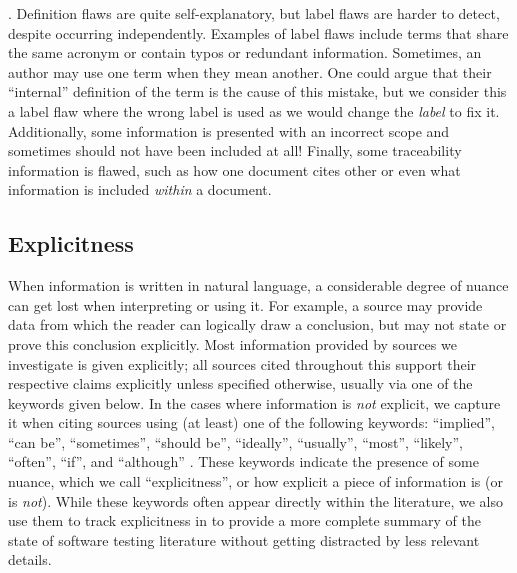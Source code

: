 \label{label-flaw-def}
. Definition flaws are quite self-explanatory, but
label flaws are harder to detect, despite occurring independently. Examples of
label flaws include terms that share the same acronym or contain typos or
redundant information. Sometimes, an author may use one term when they mean
another. One could argue that their ``internal'' definition of the term is the
cause of this mistake, but we consider this a label flaw where the wrong
label is used as we would change the \emph{label} to fix it.
\label{scope-flaw-def}%
Additionally, some information is presented with an incorrect scope and
sometimes should not have been included at all!
\label{trace-flaw-def}%
Finally, some traceability information is flawed, such as how one document
cites other or even what information is included \emph{within} a document.

\subsection{Explicitness}\label{explicitness}

\def\impKeywordsCode{\seeSrcCode{9b04254}{scripts/helpers.py}{25}{54}}

When information is written in natural language, a considerable degree of
nuance can get lost when interpreting or using it. For
example, a source may provide data from which the reader can logically draw a
conclusion, but may not state or prove this conclusion explicitly.
Most information provided by sources we investigate is given explicitly; all
sources cited throughout this \docType{} support their
respective claims explicitly unless specified otherwise, usually via one of the
keywords given below. In the cases where information is \emph{not} explicit, we
capture it when citing sources using (at least) one of the following keywords:
``implied'', ``can be'', ``sometimes'', ``should be'', ``ideally'', ``usually'',
``most'', ``likely'', ``often'', ``if'', and ``although''%
\utd{}. These keywords indicate the presence of some nuance, which we call
``explicitness'', or how explicit a piece of information is (or is \emph{not}).
While these keywords often appear directly within the literature, we
also use them to track explicitness in \ourApproachGlossary{} to provide a more
complete summary of the state of software testing literature without getting
distracted by less relevant details.

